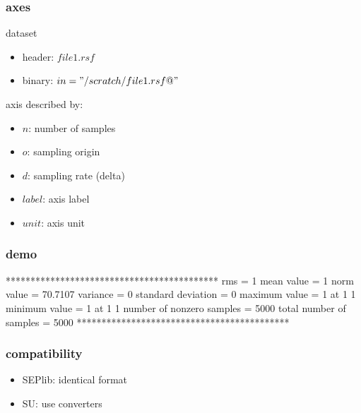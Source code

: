 \begin{frame} \frametitle{axes}

  dataset
  \begin{itemize}
  \item header: $file1.rsf$
  \item binary: $in="/scratch/file1.rsf@"$
  \end{itemize}
  
  \vfill
  
  axis described by:
  \begin{itemize}
  \item $n$: number of samples
  \item $o$: sampling origin
  \item $d$: sampling rate (delta)
  \item $label$: axis label
  \item $unit$: axis unit
  \end{itemize}
  
\end{frame}
\cwpnote{}

\begin{frame}[fragile] \frametitle{demo}

  \vfill
  \tiny
\begin{semiverbatim}
*******************************************
rms = 1
mean value = 1
norm value = 70.7107
variance = 0
standard deviation = 0
maximum value = 1 at 1 1
minimum value = 1 at 1 1
number of nonzero samples = 5000
total number of samples = 5000
*******************************************
\end{semiverbatim}

\end{frame}
\cwpnote{}

\begin{frame} \frametitle{compatibility}

  \begin{itemize}
  \item SEPlib: identical format
    \\
  \item SU: use converters
    \\
    \vspace{0.25in}
    \\
  \end{itemize}
\end{frame}
\cwpnote{}

